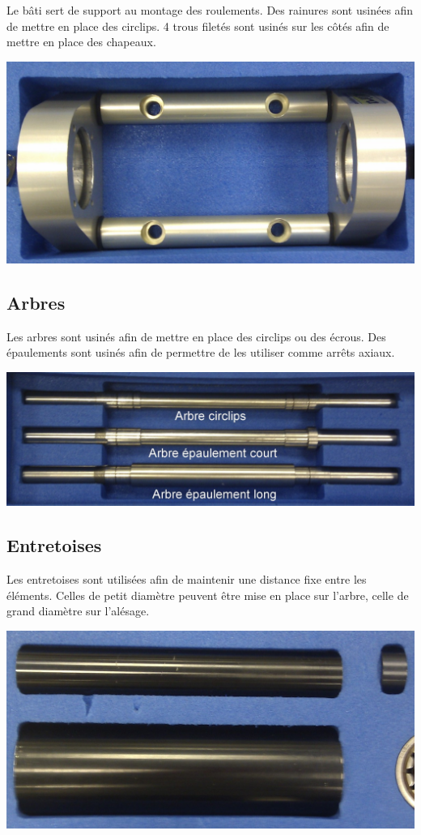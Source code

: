 Le bâti sert de support au montage des roulements. Des rainures sont usinées afin de mettre en place des circlips. 4 trous filetés sont usinés sur les côtés afin de mettre en place des chapeaux.

\begin{center}
\includegraphics[width=0.5\linewidth]{img/Roulement3.jpg}
\end{center}

\subsection{Arbres}

Les arbres sont usinés afin de mettre en place des circlips ou des écrous. Des épaulements sont usinés afin de permettre de les utiliser comme arrêts axiaux.

\begin{center}
\includegraphics[width=0.6\linewidth]{img/Roulement4.jpg}
\end{center}

\subsection{Entretoises}

Les entretoises sont utilisées afin de maintenir une distance fixe entre les éléments. Celles de petit diamètre peuvent être mise en place sur l'arbre, celle de grand diamètre sur l'alésage.

\begin{center}
\includegraphics[width=0.5\linewidth]{img/Roulement5.jpg}
\end{center}

